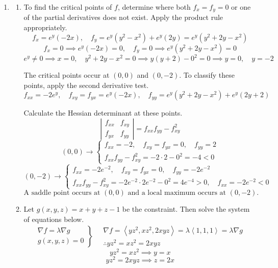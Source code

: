 \documentclass[a4paper, 12pt]{article}
\begin{document}
\newpage
{}
{}



\begin{enumerate}[leftmargin=*,label=\textbf{\arabic*.}]
\item \begin{enumerate}[leftmargin=*,label=\textbf{\alph*.}]
\item To find the critical points of $f$, determine where both $f_x=f_y=0$ or one of the partial derivatives does not exist. Apply the product rule appropriately.
\[f_x={e}^y(-2x),\quad f_y={e}^y\left(y^2-x^2\right)+{e}^y(2y)={e}^y\left(y^2+2y-x^2\right)\]
\[f_x=0\implies {e}^y(-2x) = 0,\quad f_y=0\implies{e}^y\left(y^2+2y-x^2\right)=0\]
\[{e}^y\neq0\implies x=0,\quad y^2+2y-x^2=0\implies y(y+2)-0^2=0\implies y=0,\quad y=-2\]

The critical points occur at $(0,0)$ and $(0,-2)$. To classify these points, apply the second derivative test.
\[f_{xx}=-2{e}^y,\quad f_{xy}=f_{yx}={e}^y(-2x),\quad f_{yy}={e}^y(y^2+2y-x^2)+{e}^y\left(2y+2\right)\]

Calculate the Hessian determinant at these points.
\[\left|\begin{array}{cc}
f_{xx}&f_{xy}\\
f_{yx}&f_{yy}
\end{array}\right|=f_{xx}f_{yy}-f_{xy}^2\]
\[(0,0)\rightarrow\left\{\begin{array}{l}f_{xx}=-2,\quad f_{xy}=f_{yx}=0,\quad f_{yy}=2\\[1em]
f_{xx}f_{yy}-f_{xy}^2=-2\cdot 2-0^2=-4<0\end{array}\right.\]
\[(0,-2)\rightarrow\left\{\begin{array}{l}f_{xx}=-2{e}^{-2},\quad f_{xy}=f_{yx}=0,\quad f_{yy}=-2{e}^{-2}\\[1em]f_{xx}f_{yy}-f_{xy}^2=-2{e}^{-2}\cdot2{e}^{-2}-0^2=4{e}^{-4}>0,\quad f_{xx}=-2{e}^{-2}<0\end{array}\right.\]
\[\boxed{\text{A saddle point occurs at } (0,0)\text{ and a local maximum occurs at } (0,-2).}\]

\item Let $g(x,y,z)=x+y+z-1$ be the constraint. Then solve the system of equations below.
\[
\left.
\begin{array}{ll}
\displaystyle\nabla f =\lambda \nabla g \\
\displaystyle g(x,y,z) = 0
\end{array}
\right\}\quad
\begin{array}{ll}
\nabla f = \left\langle yz^2,xz^2,2xyz\right\rangle=\lambda\left\langle1,1,1\right\rangle = \lambda\nabla g\\\therefore yz^2=xz^2=2xyz
\end{array}
\]
\[yz^2=xz^2\implies y=x\]
\[yz^2=2xyz\implies z=2x\]


\end{enumerate}
\end{enumerate}
\end{document}
